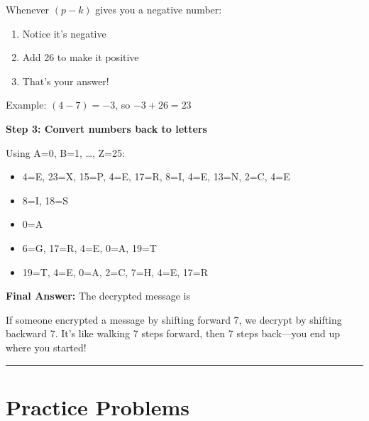 \documentclass[12pt]{article}
\begin{document}
\vspace{0.3cm}

\begin{tcolorbox}[colback=green!5!white,colframe=green!50!black,title=\textbf{Pro Tip: Handling Negative Results}]
Whenever $(p - k)$ gives you a negative number:
\begin{enumerate}
\item Notice it's negative
\item Add 26 to make it positive
\item That's your answer!
\end{enumerate}
Example: $(4 - 7) = -3$, so $-3 + 26 = 23$
\end{tcolorbox}

\vspace{0.3cm}

\textbf{Step 3: Convert numbers back to letters}

Using A=0, B=1, \ldots, Z=25:

\begin{itemize}[leftmargin=*]
\item 4=E, 23=X, 15=P, 4=E, 17=R, 8=I, 4=E, 13=N, 2=C, 4=E
\item 8=I, 18=S
\item 0=A
\item 6=G, 17=R, 4=E, 0=A, 19=T
\item 19=T, 4=E, 0=A, 2=C, 7=H, 4=E, 17=R
\end{itemize}

\vspace{0.3cm}
\noindent\textbf{Final Answer:} The decrypted message is 

\vspace{0.3cm}

\begin{tcolorbox}[colback=purple!5!white,colframe=purple!50!black,title=\textbf{Why This Works}]
If someone encrypted a message by shifting forward 7, we decrypt by shifting backward 7. It's like walking 7 steps forward, then 7 steps back—you end up where you started!
\end{tcolorbox}

\vspace{0.5cm}

\hrule

\vspace{0.5cm}

\section*{Practice Problems}
\end{document}
